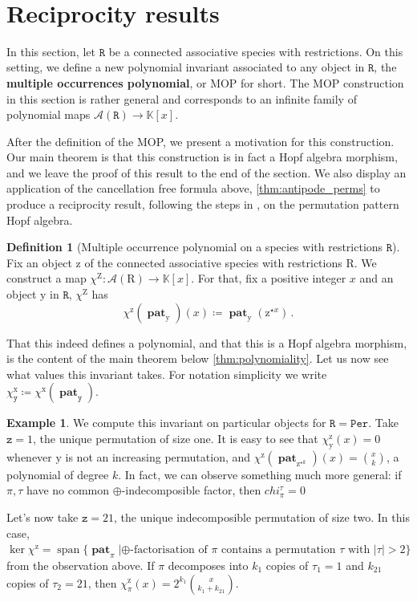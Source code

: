 \documentclass[12pt, reqno]{amsart}
\theoremstyle{definition}
\newtheorem{defin}[thm]{Definition}
\newtheorem{smpl}[thm]{Example}
\DeclareMathOperator{\pat}{\mathbf{pat}}
\DeclareMathOperator{\spn}{\mathrm{span}}
\begin{document}
\

\section{Reciprocity results\label{sec:reciprocity}}

In this section, let $\mathtt{R}$ be a connected associative species with restrictions.
On this setting, we define a new polynomial invariant associated to any object in $\mathtt{R}$, the \textbf{multiple occurrences polynomial}, or MOP for short.
The MOP construction in this section is rather general and corresponds to an infinite family of polynomial maps $\mathcal{A}(\mathtt{R}) \to \mathbb{K}[x]$.

After the definition of the MOP, we present a motivation for this construction.
Our main theorem is that this construction is in fact a Hopf algebra morphism, and we leave the proof of this result to the end of the section.
We also display an application of the cancellation free formula above, \cref{thm:antipode_perms} to produce a reciprocity result, following the steps in \cite{humpert2012incidence}, on the permutation pattern Hopf algebra.


\begin{defin}[Multiple occurrence polynomial on a species with restrictions $\mathtt{R}$]\label{MOPDef}
Fix an object $\mathrm{z}$ of the connected associative species with restrictions $\mathrm{R}$.
We construct a map $\chi^{\mathrm{Z}}: \mathcal{A}(\mathrm{R}) \to \mathbb{K}[x]$.
For that, fix a positive integer $x$ and an object $\mathrm{y}$ in $\mathtt{R}$, $\chi^{\mathrm{Z}}$ has
$$\chi^{\mathrm{z}}(\pat_{\mathrm{y}})(x) \coloneqq \pat_{\mathrm{y}}(\mathrm{z}^{\star x})\, . $$
\end{defin}

That this indeed defines a polynomial, and that this is a Hopf algebra morphism, is the content of the main theorem below \cref{thm:polynomiality}.
Let us now see what values this invariant takes.
For notation simplicity we write $\chi^{\mathrm{x}}_{\mathtt{y}} \coloneqq \chi^{\mathrm{x}}(\pat_{\mathtt{y}})$.

\begin{smpl}
We compute this invariant on particular objects for $\mathtt{R} = \mathtt{Per}$.
Take $\mathtt{z} = 1$, the unique permutation of size one.
It is easy to see that $\chi^{\mathrm{z}}_{\mathrm{y}}(x) = 0$ whenever $\mathrm{y}$ is not an increasing permutation, and $\chi^{\mathrm{z}}(\pat_{\mathrm{z}^{\star k}})(x) = \binom{x}{k}$, a polynomial of degree $k$.
In fact, we can observe something much more general: if $\pi, \tau$ have no common $\oplus$-indecomposible factor, then $chi^{\tau}_{\pi} = 0$

Let's now take $\mathtt{z} = 21$, the unique indecomposible permutation of size two.
In this case, $\ker \chi^{\mathrm{z}} = \spn \{ \pat_{\pi} | \text{$\oplus$-factorisation of $\pi$ contains a permutation $\tau$ with $|\tau| > 2$} \}$ from the observation above.
If $\pi $ decomposes into $k_1$ copies of $\tau_1 = 1$ and $k_{21}$ copies of $\tau_2 = 21$, then $\chi^{\mathrm{z}}_{\pi}(x) = 2^{k_1} \binom{x}{k_1 + k_{21}}$.
\end{smpl}
\end{document}
